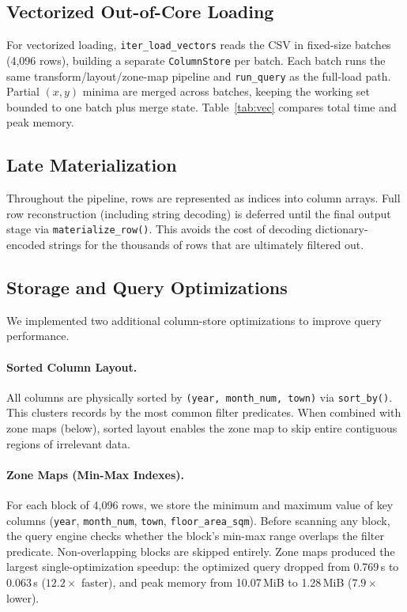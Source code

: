\documentclass[11pt,a4paper]{article}
\begin{document}
\subsection{Vectorized Out-of-Core Loading}
\label{sec:vectorized}

For vectorized loading, \texttt{iter\_load\_vectors} reads the CSV in fixed-size batches (4,096 rows), building a separate \texttt{ColumnStore} per batch. Each batch runs the same transform/layout/zone-map pipeline and \texttt{run\_query} as the full-load path. Partial $(x,y)$ minima are merged across batches, keeping the working set bounded to one batch plus merge state. Table~\ref{tab:vec} compares total time and peak memory.

\subsection{Late Materialization}

Throughout the pipeline, rows are represented as indices into column arrays. Full row reconstruction (including string decoding) is deferred until the final output stage via \texttt{materialize\_row()}. This avoids the cost of decoding dictionary-encoded strings for the thousands of rows that are ultimately filtered out.

\subsection{Storage and Query Optimizations}

We implemented two additional column-store optimizations to improve query performance.

\paragraph{Sorted Column Layout.}
All columns are physically sorted by \texttt{(year, month\_num, town)} via \texttt{sort\_by()}. This clusters records by the most common filter predicates. When combined with zone maps (below), sorted layout enables the zone map to skip entire contiguous regions of irrelevant data.

\paragraph{Zone Maps (Min-Max Indexes).}
For each block of 4,096 rows, we store the minimum and maximum value of key columns (\texttt{year}, \texttt{month\_num}, \texttt{town}, \texttt{floor\_area\_sqm}). Before scanning any block, the query engine checks whether the block's min-max range overlaps the filter predicate. Non-overlapping blocks are skipped entirely. Zone maps produced the largest single-optimization speedup: the optimized query dropped from 0.769\,s to 0.063\,s ($\mathbf{12.2\times}$ faster), and peak memory from 10.07\,MiB to 1.28\,MiB ($\mathbf{7.9\times}$ lower).
\end{document}
